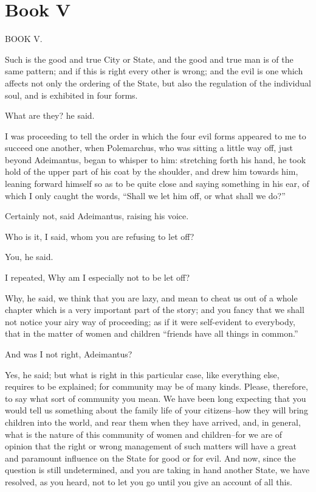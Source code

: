 



\section{Book V} %
\label{sec:book_v}



BOOK V.

Such is the good and true City or State, and the good and true man is
of the same pattern; and if this is right every other is wrong; and the
evil is one which affects not only the ordering of the State, but also
the regulation of the individual soul, and is exhibited in four forms.

What are they? he said.

I was proceeding to tell the order in which the four evil forms appeared
to me to succeed one another, when Polemarchus, who was sitting a little
way off, just beyond Adeimantus, began to whisper to him: stretching
forth his hand, he took hold of the upper part of his coat by the
shoulder, and drew him towards him, leaning forward himself so as to be
quite close and saying something in his ear, of which I only caught the
words, ``Shall we let him off, or what shall we do?''

Certainly not, said Adeimantus, raising his voice.

Who is it, I said, whom you are refusing to let off?

You, he said.

I repeated, Why am I especially not to be let off?

Why, he said, we think that you are lazy, and mean to cheat us out of a
whole chapter which is a very important part of the story; and you fancy
that we shall not notice your airy way of proceeding; as if it were
self-evident to everybody, that in the matter of women and children
``friends have all things in common.''

And was I not right, Adeimantus?

Yes, he said; but what is right in this particular case, like everything
else, requires to be explained; for community may be of many kinds.
Please, therefore, to say what sort of community you mean. We have been
long expecting that you would tell us something about the family life
of your citizens--how they will bring children into the world, and rear
them when they have arrived, and, in general, what is the nature of this
community of women and children--for we are of opinion that the right
or wrong management of such matters will have a great and paramount
influence on the State for good or for evil. And now, since the question
is still undetermined, and you are taking in hand another State, we have
resolved, as you heard, not to let you go until you give an account of
all this.

